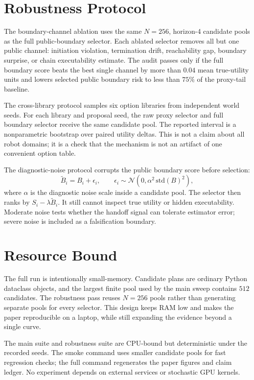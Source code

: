\documentclass{article}
\begin{document}
\section{Robustness Protocol}

The boundary-channel ablation uses the same \(N=256\), horizon-4 candidate pools as the full public-boundary selector. Each ablated selector removes all but one public channel: initiation violation, termination drift, reachability gap, boundary surprise, or chain executability estimate. The audit passes only if the full boundary score beats the best single channel by more than \(0.04\) mean true-utility units and lowers selected public boundary risk to less than \(75\%\) of the proxy-tail baseline.

The cross-library protocol samples six option libraries from independent world seeds. For each library and proposal seed, the raw proxy selector and full boundary selector receive the same candidate pool. The reported interval is a nonparametric bootstrap over paired utility deltas. This is not a claim about all robot domains; it is a check that the mechanism is not an artifact of one convenient option table.

The diagnostic-noise protocol corrupts the public boundary score before selection:
\[
\widetilde B_i = B_i + \epsilon_i,\qquad
\epsilon_i \sim \mathcal N(0, \alpha^2\,\mathrm{std}(B)^2),
\]
where \(\alpha\) is the diagnostic noise scale inside a candidate pool. The selector then ranks by \(S_i-\lambda \widetilde B_i\). It still cannot inspect true utility or hidden executability. Moderate noise tests whether the handoff signal can tolerate estimator error; severe noise is included as a falsification boundary.

\section{Resource Bound}

The full run is intentionally small-memory. Candidate plans are ordinary Python dataclass objects, and the largest finite pool used by the main sweep contains \(512\) candidates. The robustness pass reuses \(N=256\) pools rather than generating separate pools for every selector. This design keeps RAM low and makes the paper reproducible on a laptop, while still expanding the evidence beyond a single curve.

The main suite and robustness suite are CPU-bound but deterministic under the recorded seeds. The smoke command uses smaller candidate pools for fast regression checks; the full command regenerates the paper figures and claim ledger. No experiment depends on external services or stochastic GPU kernels.
\end{document}
